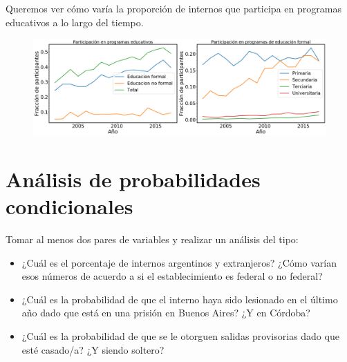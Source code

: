 \documentclass[10pt]{article}
\begin{document}
Queremos ver cómo varía la proporción de internos que participa en programas educativos a lo largo del tiempo.

\begin{figure}[H]
	\centering
	\includegraphics[scale=0.28]{graficos/educacion.png}
	\caption{}
\end{figure}

\section{Análisis de probabilidades condicionales}
Tomar al menos dos pares de variables y realizar un análisis del tipo:

\begin{itemize}
	\item ¿Cuál es el porcentaje de internos argentinos y extranjeros? ¿Cómo varían esos números de acuerdo a si el establecimiento es federal o no federal?
	\item ¿Cuál es la probabilidad de que el interno haya sido lesionado en el último año dado que está en una prisión en Buenos Aires? ¿Y en Córdoba?
	\item ¿Cuál es la probabilidad de que se le otorguen salidas provisorias dado que esté casado/a? ¿Y siendo soltero?
\end{itemize}
\end{document}
